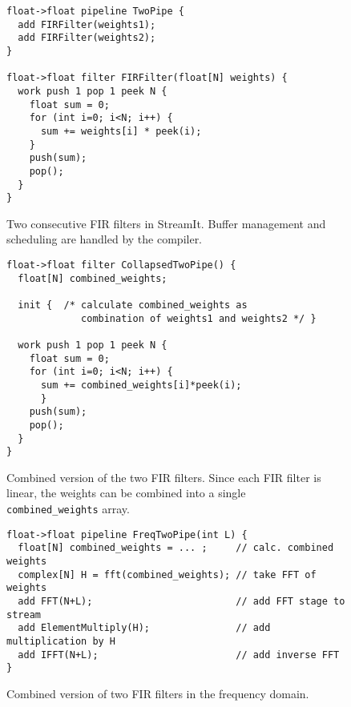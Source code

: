 \begin{figure}[t]
\vspace{-6pt}
\scriptsize
\begin{verbatim}
float->float pipeline TwoPipe {
  add FIRFilter(weights1);
  add FIRFilter(weights2);
}

float->float filter FIRFilter(float[N] weights) {
  work push 1 pop 1 peek N {
    float sum = 0;
    for (int i=0; i<N; i++) {
      sum += weights[i] * peek(i);
    }
    push(sum);
    pop();
  }
}
\end{verbatim}
\vspace{-18pt}
\caption{Two consecutive FIR filters in StreamIt.  Buffer management
and scheduling are handled by the compiler.\protect\label{fig:example-streamit}}
\begin{verbatim}
float->float filter CollapsedTwoPipe() {
  float[N] combined_weights;

  init {  /* calculate combined_weights as 
             combination of weights1 and weights2 */ }

  work push 1 pop 1 peek N {
    float sum = 0;
    for (int i=0; i<N; i++) {
      sum += combined_weights[i]*peek(i);
      }
    push(sum);
    pop();
  }
}
\end{verbatim}
\vspace{-18pt}
\caption{Combined version of the two FIR filters.  Since each FIR
filter is linear, the weights can be combined into a single {\tt
combined\_weights} array.\protect\label{fig:example-combine}}
\begin{verbatim}
float->float pipeline FreqTwoPipe(int L) {
  float[N] combined_weights = ... ;     // calc. combined weights 
  complex[N] H = fft(combined_weights); // take FFT of weights     
  add FFT(N+L);                         // add FFT stage to stream 
  add ElementMultiply(H);               // add multiplication by H 
  add IFFT(N+L);                        // add inverse FFT         
}
\end{verbatim}
\vspace{-18pt}
\caption{Combined version of two FIR filters in the frequency domain.
\protect\label{fig:example-frequency}}
\vspace{-20pt}
\end{figure}

